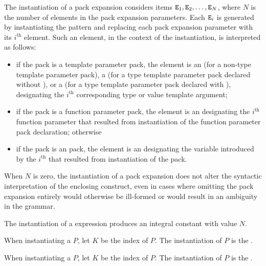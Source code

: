 \documentclass{wg21}
\begin{document}
\pnum
The instantiation of a pack expansion considers
items $\texttt{E}_1, \texttt{E}_2, \dotsc, \texttt{E}_N$,
where
$N$ is the number of elements in the pack expansion parameters.
Each $\texttt{E}_i$ is generated by instantiating the pattern and
replacing each pack expansion parameter with its $i^\text{th}$ element.
Such an element, in the context of the instantiation, is interpreted as
follows:
\begin{itemize}
    \item
    if the pack is a template parameter pack, the element is
    an 
    (for a non-type template parameter pack),
    a 
    (for a type template parameter pack declared without ), or
    a 
    (for a type template parameter pack declared with ),
    designating the $i^\text{th}$ corresponding type or value template argument;

    \item
    if the pack is a function parameter pack, the element is an
    designating the $i^\text{th}$ function parameter
    that resulted from instantiation of
    the function parameter pack declaration;
    otherwise

    \item
    if the pack is an  pack,
    the element is an 
    designating the variable introduced by
    the $i^\text{th}$ 
    that resulted from instantiation of
    the  pack.
\end{itemize}
When $N$ is zero, the instantiation of a pack expansion
does not alter the syntactic interpretation of the enclosing construct,
even in cases where omitting the pack expansion entirely would
otherwise be ill-formed or would result in an ambiguity in the grammar.

\pnum
The instantiation of a  expression produces
an integral constant with value $N$.

\begin{addedblock}
\pnum

When instantiating a  $P$,
let $K$ be the index of $P$.
The instantiation of $P$ is the  .


When instantiating a  $P$,
let $K$ be the index of $P$.
The instantiation of $P$ is the  .
\end{addedblock}
\end{document}
